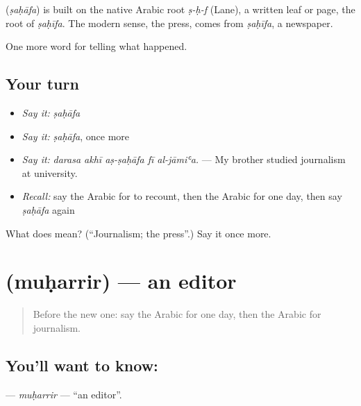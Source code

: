 \begin{cousinweb}
\textbf{} (\emph{ṣaḥāfa}) is built on the native Arabic root \emph{ṣ-ḥ-f} (Lane), a written leaf or page, the root of \emph{ṣaḥīfa}. The modern sense, the press, comes from \emph{ṣaḥīfa}, a newspaper.
\end{cousinweb}

\begin{grammarlens}[title={What you've built}]
One more word for telling what happened.
\end{grammarlens}

\subsection*{Your turn}
\begin{itemize}
\raggedright
  \item \emph{Say it:} \emph{ṣaḥāfa}
  \item \emph{Say it:} \emph{ṣaḥāfa}, once more
  \item \emph{Say it:} \emph{darasa akhī aṣ-ṣaḥāfa fī al-jāmiʿa.} — My brother studied journalism at university.
  \item \emph{Recall:} say the Arabic for to recount, then the Arabic for one day, then say \emph{ṣaḥāfa} again
\end{itemize}

\begin{tcolorbox}[breakable,colback=teal!4,colframe=teal!35!black,title={Before you move on}]
What does  mean? (\textquotedblleft{}Journalism; the press\textquotedblright{}.) Say it once more.
\end{tcolorbox}
\section[\texorpdfstring{\ar{محرر} (muḥarrir)}{محرر (muḥarrir)}]{ (muḥarrir) — an editor}

\label{lesson:AR-C296-muharrir}



\begin{quote}
Before the new one: say the Arabic for one day, then the Arabic for journalism.
\end{quote}

\subsection*{You'll want to know: }
\textbf{} — \emph{muḥarrir} — \textquotedblleft{}an editor\textquotedblright{}.

